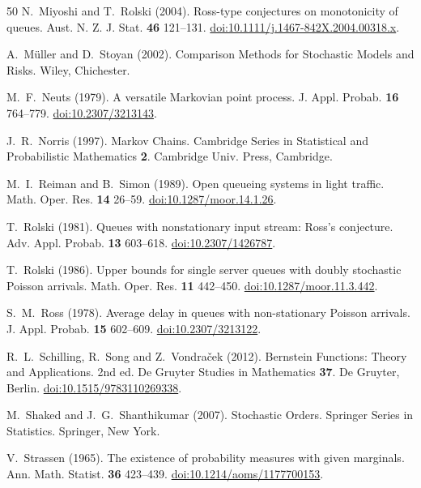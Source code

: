 \documentclass[aap,preprint]{imsart}
\numberwithin{equation}{section}
\theoremstyle{plain}
\theoremstyle{definition}
\newcommand{\1}{\mathbf 1}
\begin{document}
\begin{thebibliography}{50}
N.~Miyoshi and T.~Rolski (2004).
Ross-type conjectures on monotonicity of queues.
Aust. N. Z. J. Stat. \textbf{46} 121--131.
\href{https://doi.org/10.1111/j.1467-842X.2004.00318.x}{doi:10.1111/j.1467-842X.2004.00318.x}.

A.~M\"uller and D.~Stoyan (2002).
Comparison Methods for Stochastic Models and Risks.
Wiley, Chichester.

M.~F.~Neuts (1979).
A versatile Markovian point process.
J. Appl. Probab. \textbf{16} 764--779.
\href{https://doi.org/10.2307/3213143}{doi:10.2307/3213143}.

J.~R.~Norris (1997).
Markov Chains.
Cambridge Series in Statistical and Probabilistic Mathematics \textbf{2}. Cambridge Univ. Press, Cambridge.

M.~I.~Reiman and B.~Simon (1989).
Open queueing systems in light traffic.
Math. Oper. Res. \textbf{14} 26--59.
\href{https://doi.org/10.1287/moor.14.1.26}{doi:10.1287/moor.14.1.26}.

T.~Rolski (1981).
Queues with nonstationary input stream: Ross's conjecture.
Adv. Appl. Probab. \textbf{13} 603--618.
\href{https://doi.org/10.2307/1426787}{doi:10.2307/1426787}.

T.~Rolski (1986).
Upper bounds for single server queues with doubly stochastic Poisson arrivals.
Math. Oper. Res. \textbf{11} 442--450.
\href{https://doi.org/10.1287/moor.11.3.442}{doi:10.1287/moor.11.3.442}.

S.~M.~Ross (1978).
Average delay in queues with non-stationary Poisson arrivals.
J. Appl. Probab. \textbf{15} 602--609.
\href{https://doi.org/10.2307/3213122}{doi:10.2307/3213122}.

R.~L.~Schilling, R.~Song and Z.~Vondra\v{c}ek (2012).
Bernstein Functions: Theory and Applications.
2nd ed. De Gruyter Studies in Mathematics \textbf{37}. De Gruyter, Berlin.
\href{https://doi.org/10.1515/9783110269338}{doi:10.1515/9783110269338}.

M.~Shaked and J.~G.~Shanthikumar (2007).
Stochastic Orders.
Springer Series in Statistics. Springer, New York.

V.~Strassen (1965).
The existence of probability measures with given marginals.
Ann. Math. Statist. \textbf{36} 423--439.
\href{https://doi.org/10.1214/aoms/1177700153}{doi:10.1214/aoms/1177700153}.


\end{thebibliography}
\end{document}
